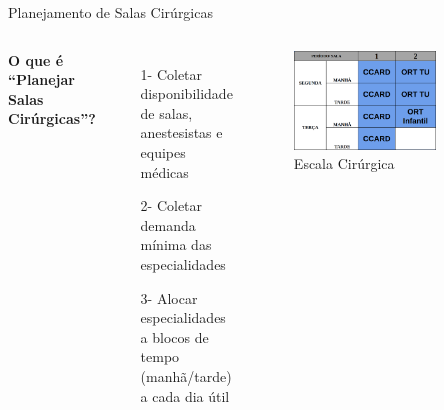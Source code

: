 \documentclass[10pt]{beamer}
\begin{document}
\begin{frame}{Planejamento de Salas Cirúrgicas}
    \begin{columns}[t]
        \textbf{O que é ``Planejar Salas Cirúrgicas''?}
        \begin{enumerate}
            \setlength\itemsep{.5em}
            \item[1-] Coletar disponibilidade de salas, anestesistas e equipes médicas
            \item[2-] Coletar demanda mínima das especialidades
            \item[3-] Alocar especialidades a blocos de tempo (manhã/tarde) a cada dia útil
        \end{enumerate}
        \begin{figure}
            \centering
            \includegraphics[width=0.8\textwidth]{images/schedule.png}
            \caption{Escala Cirúrgica\label{fig:schedule}}
        \end{figure}
    \end{columns}
\end{frame}
\end{document}

